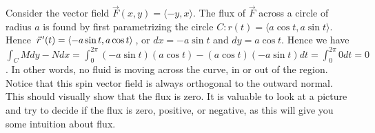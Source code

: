 \begin{example}
%
 Consider the vector field {$\vec F(x,y)=\langle-y,x\rangle$}.  The flux of
  {$\vec F$} across a circle of radius $a$ is found by first
  parametrizing the circle $C\colon r(t) = \langle a\cos t,a\sin t\rangle$.  Hence $\vec
  r^{\,\prime}(t) = \langle-a\sin t,a\cos t\rangle$, or $dx=-a\sin t$ and $dy = a\cos
  t$. Hence we have $\int_C Mdy-Ndx = \int_0^{2\pi} (-a\sin t)(a\cos t)-(a\cos
  t)(-a\sin t)dt = \int_0^{2\pi} 0 dt = 0$.  In other words, no fluid is
  moving across the curve, in or out of the region.  Notice that this
  spin vector field is always orthogonal to the outward normal. This should
  visually show that the flux is zero. It is valuable to look at a
  picture and try to decide if the flux is zero, positive, or
  negative, as this will give you some intuition about flux.
\end{example}

